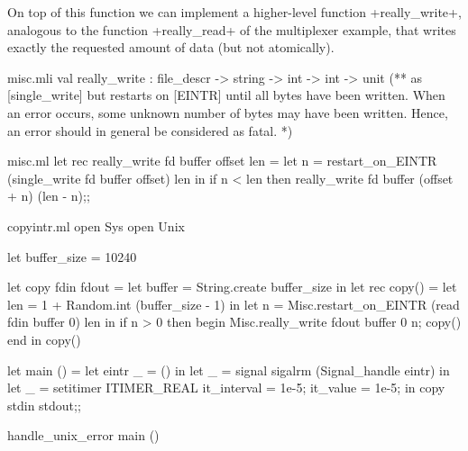 On top of this function we can implement a higher-level function
\ml+really_write+, analogous to the function \ml+really_read+ of the
multiplexer example, that writes exactly the requested amount of data
(but not atomically).
%
\begin{codefile}{misc.mli}
val really_write : file_descr -> string -> int -> int -> unit
(** as [single_write] but restarts on [EINTR] until all bytes have been
written. When an error occurs, some unknown number of bytes may have been
written. Hence, an error should in general be considered as fatal. *)
\end{codefile}
%
\begin{listingcodefile}{misc.ml}
let rec really_write fd buffer offset len =
  let n = restart_on_EINTR (single_write fd buffer offset) len in
  if n < len then really_write fd buffer (offset + n) (len - n);;
\end{listingcodefile}
%
\begin{codefile}{copyintr.ml}
open Sys
open Unix

let buffer_size = 10240

let copy fdin fdout = 
  let buffer = String.create buffer_size in
  let rec copy()  =
    let len = 1 + Random.int (buffer_size - 1) in
    let n = Misc.restart_on_EINTR (read fdin buffer 0) len in
    if n > 0 then
      begin
        Misc.really_write fdout buffer 0 n;
        copy()
      end in
  copy()

let main () =
  let eintr _ = () in
  let _ = signal sigalrm (Signal_handle eintr) in
  let _ = setitimer ITIMER_REAL { it_interval = 1e-5; it_value = 1e-5; } in
  copy stdin stdout;;

handle_unix_error main ()
\end{codefile}
%


